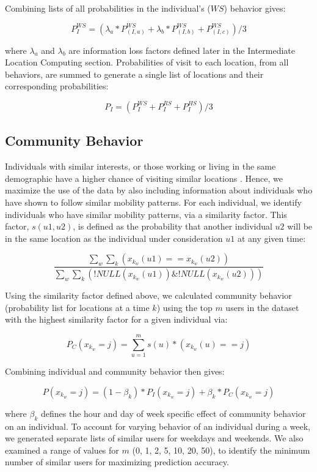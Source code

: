 Combining lists of all probabilities in the individual's ($WS$) behavior gives: 
\begin{small}
\[
P_I^{WS}=(\lambda_a*P_{(I,a)}^{WS}+\lambda_b*P_{(I,b)}^{WS}+P_{(I,c)}^{WS})/3
\]
\end{small}
where $\lambda_a$ and $\lambda_b$ are information loss factors defined later in the Intermediate Location Computing section. 
Probabilities of visit to each location, from all behaviors, are summed to generate a single list of locations and their corresponding probabilities:
\begin{small}
\[
P_I= (P_I^{WS}+P_I^{RS}+P_I^{HS}) / 3
\]
\end{small}

\subsection{Community Behavior}
Individuals with similar interests, or those working or living in the same demographic have a higher chance of visiting similar locations \cite{56}. Hence, we maximize the use of the data by also including information about individuals who have shown to follow similar mobility patterns. For each individual, we identify individuals who have similar mobility patterns, via a similarity factor. This factor, $s(u1,u2)$, is defined as the probability that another individual $u2$ will be in the same location as the individual under consideration $u1$ at any given time: 
\begin{small}
\[ 
\frac{\sum_w \sum_k (x_{k_w} (u1)==x_{k_w} (u2))} { \sum_w \sum_k (!NULL(x_{k_w} (u1)) \& !NULL(x_{k_w} (u2)))}
\]
\end{small}
Using the similarity factor defined above, we calculated community behavior (probability list for locations at a time $k$) using the top $m$ users in the dataset with the highest similarity factor for a given individual via:
\begin{small}
\[
P_C(x_{k_w}=j)= \sum_{u=1}^m s(u)*(x_{k_w}(u)==j)
\]
\end{small}
Combining individual and community behavior then gives: 
\begin{small}
\[
P(x_{k_w}=j)= (1-\beta_k)*P_I(x_{k_w}=j) + \beta_k*P_C(x_{k_w}=j) 
\]
\end{small}
where $\beta_k$ defines the hour and day of week specific effect of community behavior on an individual. To account for varying behavior of an individual during a week, we generated separate lists of similar users for weekdays and weekends. We also examined a range of values for $m$ (0, 1, 2, 5, 10, 20, 50), to identify the minimum number of similar users for maximizing prediction accuracy. 

